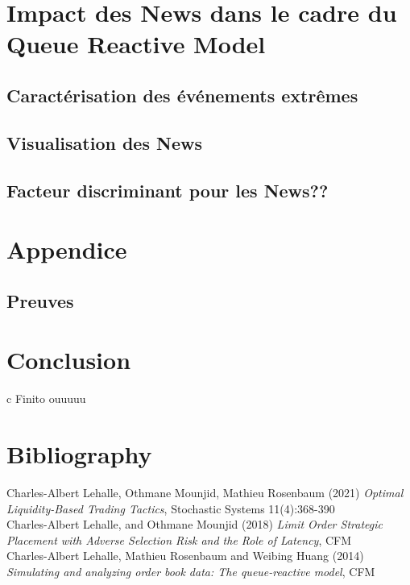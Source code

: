 \documentclass[12pt,a4paper]{article}
\theoremstyle{definition}
\theoremstyle{remark}
\begin{document}
    \newpage
    \vspace*{5cm}
    \section{Impact des News dans le cadre du Queue Reactive Model}
    \vspace*{2cm}

    \subsection{Caractérisation des événements extrêmes}

    \subsection{Visualisation des News}

    \subsection{Facteur discriminant pour les News??}



    \newpage
    \vspace*{5cm}
    \section*{Appendice}
    \vspace*{2cm}
    \subsection*{Preuves}


    \newpage
    \vspace*{5cm}
    \section*{Conclusion}
    \vspace*{2cm}
    c Finito ouuuuu
    \newpage
    \vspace*{5cm}
    \section*{Bibliography}

    Charles-Albert Lehalle, Othmane Mounjid, Mathieu Rosenbaum (2021) \textit{Optimal Liquidity-Based Trading Tactics}, Stochastic Systems 11(4):368-390 
    \\
    Charles-Albert Lehalle, and Othmane Mounjid (2018) \textit{Limit Order Strategic Placement
    with Adverse Selection Risk
    and the Role of Latency}, CFM
    \\
    Charles-Albert Lehalle, Mathieu Rosenbaum and Weibing Huang (2014) \textit{Simulating and analyzing order book data: The queue-reactive model}, CFM



    
\end{document}
